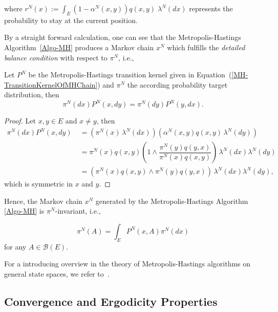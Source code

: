 where $ r^{N}(x):= \int_{E} \left( 1 - \alpha^{N}(x,y) \right) q(x,y) \; \lambda^{N}(dx) $ represents the probability to stay at the current position.

By a straight forward calculation, one can see that the Metropolis-Hastings Algorithm~\ref{Algo-MH} produces a Markov chain $ x^{N} $ which fulfills the \emph{detailed balance condition} with respect to $ \pi^{N} $, i.e.,

\begin{lemma}
\label{Lemma - detailed balance}
 Let $P^N$ be the Metropolis-Hastings transition kernel given in Equation~(\ref{MH-TransitionKernelOfMHChain}) and $\pi^N$ the according probability target distribution, then
\begin{equation}
 \pi^{N}(dx) P^{N}(x,dy) = \pi^{N}(dy) P^{N}(y,dx).
\end{equation}
\end{lemma}


\begin{proof}
 Let $ x, y \in E $ and $ x \ne y $, then
 \begin{align*}
  \pi^{N}(dx) P^{N}(x,dy) & \; = \left( \pi^{N}(x) \, \lambda^{N}(dx) \right)  \left( \alpha^{N}(x,y) q(x,y) \, \lambda^{N}(dy) \right) \\
  & \; = \pi^{N}(x)  q(x,y) \left( 1 \wedge \dfrac{\pi^{N}(y) q(y,x) }{\pi^{N}(x) q(x,y)} \right) \, \lambda^{N}(dx) \lambda^{N}(dy) \\
  & \; = \left( \pi^{N}(x)  q(x,y) \wedge \pi^{N}(y) q(y,x) \right) \, \lambda^{N}(dx) \lambda^{N}(dy),
 \end{align*}
 which is symmetric in $x$ and $y$.

\end{proof}

Hence, the Markov chain $ x^{N} $ generated by the Metropolis-Hastings Algorithm \ref{Algo-MH} is $ \pi^{N} $-invariant, i.e.,

\begin{equation}
 \pi^{N} (A) = \int_{E} P^{N}(x,A) \pi^{N}(dx)
\end{equation}
for any $ A \in \mathcal{B}(E) $.

For a introducing overview in the theory of Metropolis-Hastings algorithms on general state spaces, we refer to~\autocite{Robert2005, Rosenthal2004}.



\subsection{Convergence and Ergodicity Properties}
\label{MH-ConvergenceProperties}

